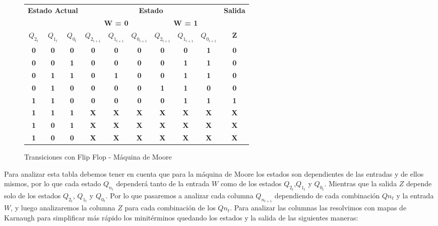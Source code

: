 \begin{figure}[H]
	\begin{center}
		\begin{tabular}{|c|c|c|c|c|c|c|c|c|c|}
\hline
\multicolumn{3}{|c|}{\multirow{2}{*}{\textbf{Estado Actual}}} & \multicolumn{6}{c|}{\textbf{Estado}} & \multirow{2}{*}{\textbf{Salida}} \\ \cline{4-9}
\multicolumn{3}{|c|}{} & \multicolumn{3}{c|}{\textbf{W = 0}} & \multicolumn{3}{c|}{\textbf{W = 1}} &  \\ \hline
\textbf{$Q_{2_{t}}$} & \textbf{$Q_{1_{t}}$} & \textbf{$Q_{0_{t}}$} & \textbf{$Q_{2_{t+1}}$} & \textbf{$Q_{1_{t+1}}$} & \textbf{$Q_{0_{t+1}}$} & \textbf{$Q_{2_{t+1}}$} & \textbf{$Q_{1_{t+1}}$} & \textbf{$Q_{0_{t+1}}$} & \textbf{Z} \\ \hline
\textbf{0} & \textbf{0} & \textbf{0} & \textbf{0} & \textbf{0} & \textbf{0} & \textbf{0} & \textbf{0} & \textbf{1} & \textbf{0} \\ \hline
\textbf{0} & \textbf{0} & \textbf{1} & \textbf{0} & \textbf{0} & \textbf{0} & \textbf{0} & \textbf{1} & \textbf{1} & \textbf{0} \\ \hline
\textbf{0} & \textbf{1} & \textbf{1} & \textbf{0} & \textbf{1} & \textbf{0} & \textbf{0} & \textbf{1} & \textbf{1} & \textbf{0} \\ \hline
\textbf{0} & \textbf{1} & \textbf{0} & \textbf{0} & \textbf{0} & \textbf{0} & \textbf{1} & \textbf{1} & \textbf{0} & \textbf{0} \\ \hline
\textbf{1} & \textbf{1} & \textbf{0} & \textbf{0} & \textbf{0} & \textbf{0} & \textbf{0} & \textbf{1} & \textbf{1} & \textbf{1} \\ \hline
\textbf{1} & \textbf{1} & \textbf{1} & \textbf{X} & \textbf{X} & \textbf{X} & \textbf{X} & \textbf{X} & \textbf{X} & \textbf{X} \\ \hline
\textbf{1} & \textbf{0} & \textbf{1} & \textbf{X} & \textbf{X} & \textbf{X} & \textbf{X} & \textbf{X} & \textbf{X} & \textbf{X} \\ \hline
\textbf{1} & \textbf{0} & \textbf{0} & \textbf{X} & \textbf{X} & \textbf{X} & \textbf{X} & \textbf{X} & \textbf{X} & \textbf{X} \\ \hline
		\end{tabular}
		\caption{Transiciones con Flip Flop - Máquina de Moore} 
		\label{2_fig2}
	\end{center}
\end{figure}

Para analizar esta tabla debemos tener en cuenta que para la máquina de Moore los estados son dependientes de las entradas y de ellos mismos, por lo que cada estado $Q_{n_{t}}$ depender\'a tanto de la entrada $W$ como de los estados $Q_{2_{t}}$,$Q_{1_{t}}$ y $Q_{0_{t}}$. Mientras que la salida $Z$ depende solo de los estados $Q_{2_{t}}$, $Q_{1_{t}}$ y $Q_{0_{t}}$. Por lo que pasaremos a analizar cada columna $Q_{n_{t+1}}$ dependiendo de cada combinaci\'on $Q{n_{t}}$ y la entrada $W$, y luego analizaremos la columna $Z$ para cada combinaci\'on de los $Q{n_{t}}$. Para analizar las columnas las resolvimos con mapas de Karnaugh para simplificar más rápido los minit\'erminos quedando los estados y la salida de las siguientes maneras:
	
